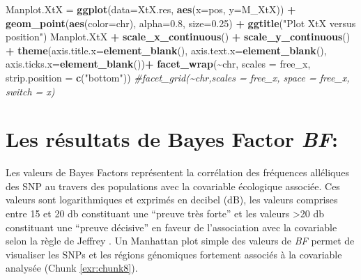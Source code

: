 \documentclass[
  openany]{book}
\newenvironment{Shaded}{\begin{snugshade}}{\end{snugshade}}
\newcommand{\AttributeTok}[1]{\textcolor[rgb]{0.13,0.29,0.53}{#1}}
\newcommand{\CommentTok}[1]{\textcolor[rgb]{0.56,0.35,0.01}{\textit{#1}}}
\newcommand{\FloatTok}[1]{\textcolor[rgb]{0.00,0.00,0.81}{#1}}
\newcommand{\FunctionTok}[1]{\textcolor[rgb]{0.13,0.29,0.53}{\textbf{#1}}}
\newcommand{\NormalTok}[1]{#1}
\newcommand{\OtherTok}[1]{\textcolor[rgb]{0.56,0.35,0.01}{#1}}
\newcommand{\SpecialCharTok}[1]{\textcolor[rgb]{0.81,0.36,0.00}{\textbf{#1}}}
\newcommand{\StringTok}[1]{\textcolor[rgb]{0.31,0.60,0.02}{#1}}
\theoremstyle{definition}
\theoremstyle{definition}
\theoremstyle{definition}
\theoremstyle{definition}
\theoremstyle{remark}
\begin{document}
\begin{Shaded}
\begin{Highlighting}[]
\NormalTok{Manplot.XtX }\OtherTok{=} \FunctionTok{ggplot}\NormalTok{(}\AttributeTok{data=}\NormalTok{XtX.res, }\FunctionTok{aes}\NormalTok{(}\AttributeTok{x=}\NormalTok{pos, }\AttributeTok{y=}\NormalTok{M\_XtX)) }\SpecialCharTok{+}
  \FunctionTok{geom\_point}\NormalTok{(}\FunctionTok{aes}\NormalTok{(}\AttributeTok{color=}\NormalTok{chr), }\AttributeTok{alpha=}\FloatTok{0.8}\NormalTok{, }\AttributeTok{size=}\FloatTok{0.25}\NormalTok{) }\SpecialCharTok{+}
  \FunctionTok{ggtitle}\NormalTok{(}\StringTok{"Plot XtX versus position"}\NormalTok{)}
\NormalTok{Manplot.XtX }\SpecialCharTok{+} \FunctionTok{scale\_x\_continuous}\NormalTok{() }\SpecialCharTok{+}
  \FunctionTok{scale\_y\_continuous}\NormalTok{() }\SpecialCharTok{+}
  \FunctionTok{theme}\NormalTok{(}\AttributeTok{axis.title.x=}\FunctionTok{element\_blank}\NormalTok{(), }\AttributeTok{axis.text.x=}\FunctionTok{element\_blank}\NormalTok{(), }\AttributeTok{axis.ticks.x=}\FunctionTok{element\_blank}\NormalTok{())}\SpecialCharTok{+}
  \FunctionTok{facet\_wrap}\NormalTok{(}\SpecialCharTok{\textasciitilde{}}\NormalTok{chr, }\AttributeTok{scales =} \StringTok{\textquotesingle{}free\_x\textquotesingle{}}\NormalTok{, }\AttributeTok{strip.position =} \FunctionTok{c}\NormalTok{(}\StringTok{"bottom"}\NormalTok{))}
  \CommentTok{\#facet\_grid(\textasciitilde{}chr,scales = \textquotesingle{}free\_x\textquotesingle{}, space = \textquotesingle{}free\_x\textquotesingle{}, switch = \textquotesingle{}x\textquotesingle{})}
\end{Highlighting}
\end{Shaded}

\hypertarget{les-ruxe9sultats-de-bayes-factor-bf}{%
\section*{\texorpdfstring{Les résultats de Bayes Factor \emph{BF}:}{Les résultats de Bayes Factor BF:}}\label{les-ruxe9sultats-de-bayes-factor-bf}}

Les valeurs de Bayes Factors représentent la corrélation des fréquences alléliques des SNP au travers des populations avec la covariable écologique associée.
Ces valeurs sont logarithmiques et exprimés en decibel (dB), les valeurs comprises entre 15 et 20 db constituant une ``preuve très forte'' et les valeurs \textgreater20 db constituant une ``preuve décisive'' en faveur de l'association avec la covariable selon la règle de Jeffrey \citep{jeffreys_theory_1998}.
Un Manhattan plot simple des valeurs de \emph{BF} permet de visualiser les SNPs et les régions génomiques fortement associés à la covariable analysée (Chunk \ref{exr:chunk8}).
\end{document}
